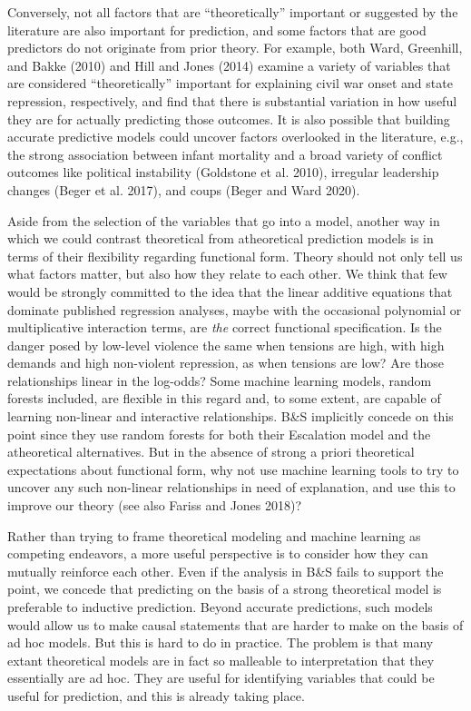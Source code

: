 \documentclass[
]{article}
\begin{document}
Conversely, not all factors that are ``theoretically'' important or suggested by the literature are also important for prediction, and some factors that are good predictors do not originate from prior theory. For example, both Ward, Greenhill, and Bakke (2010) and Hill and Jones (2014) examine a variety of variables that are considered ``theoretically'' important for explaining civil war onset and state repression, respectively, and find that there is substantial variation in how useful they are for actually predicting those outcomes. It is also possible that building accurate predictive models could uncover factors overlooked in the literature, e.g., the strong association between infant mortality and a broad variety of conflict outcomes like political instability (Goldstone et al. 2010), irregular leadership changes (Beger et al. 2017), and coups (Beger and Ward 2020).

Aside from the selection of the variables that go into a model, another way in which we could contrast theoretical from atheoretical prediction models is in terms of their flexibility regarding functional form. Theory should not only tell us what factors matter, but also how they relate to each other. We think that few would be strongly committed to the idea that the linear additive equations that dominate published regression analyses, maybe with the occasional polynomial or multiplicative interaction terms, are \emph{the} correct functional specification. Is the danger posed by low-level violence the same when tensions are high, with high demands and high non-violent repression, as when tensions are low? Are those relationships linear in the log-odds? Some machine learning models, random forests included, are flexible in this regard and, to some extent, are capable of learning non-linear and interactive relationships. B\&S implicitly concede on this point since they use random forests for both their Escalation model and the atheoretical alternatives. But in the absence of strong a priori theoretical expectations about functional form, why not use machine learning tools to try to uncover any such non-linear relationships in need of explanation, and use this to improve our theory (see also Fariss and Jones 2018)?

Rather than trying to frame theoretical modeling and machine learning as competing endeavors, a more useful perspective is to consider how they can mutually reinforce each other. Even if the analysis in B\&S fails to support the point, we concede that predicting on the basis of a strong theoretical model is preferable to inductive prediction. Beyond accurate predictions, such models would allow us to make causal statements that are harder to make on the basis of ad hoc models. But this is hard to do in practice. The problem is that many extant theoretical models are in fact so malleable to interpretation that they essentially are ad hoc. They are useful for identifying variables that could be useful for prediction, and this is already taking place.
\end{document}
